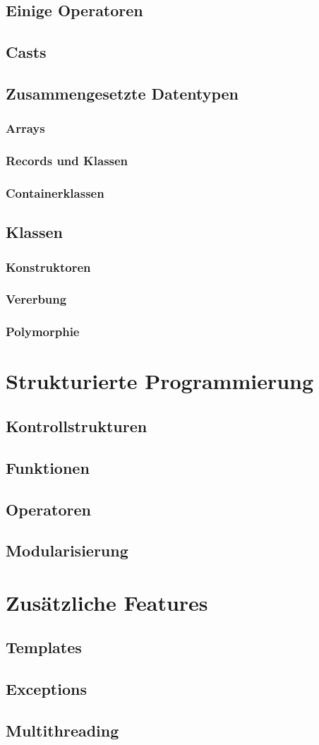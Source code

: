 \documentclass[a4paper]{report}
\begin{document}
\section{Einige Operatoren}
\section{Casts}
\section{Zusammengesetzte Datentypen}
\subsection{Arrays}
\subsection{Records und Klassen}
\subsection{Containerklassen}
\section{Klassen}
\subsection{Konstruktoren}
\subsection{Vererbung}
\subsection{Polymorphie}

\chapter{Strukturierte Programmierung}
\section{Kontrollstrukturen}
\section{Funktionen}
\section{Operatoren}
\section{Modularisierung}

\chapter{Zusätzliche Features}
\section{Templates}
\section{Exceptions}
\section{Multithreading}
\end{document}
